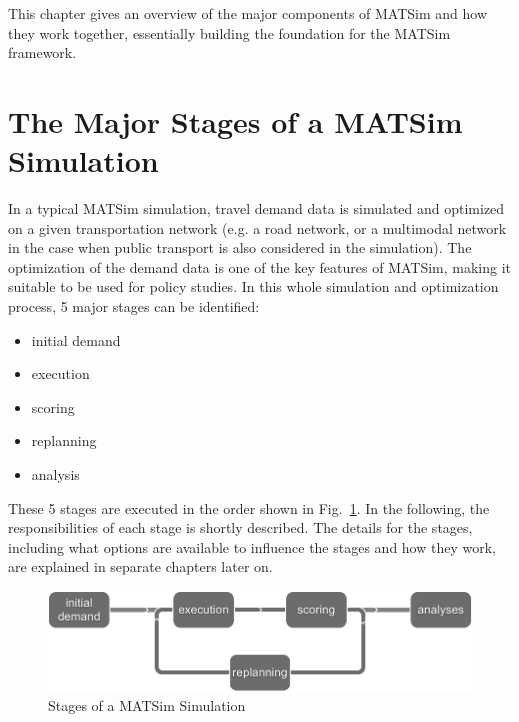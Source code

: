 
 
\bigskip

\begin{chapter-intro}
This chapter gives an overview of the major components of MATSim and how they
work together, essentially building the foundation for the MATSim framework.
\end{chapter-intro}

\section{The Major Stages of a MATSim Simulation}

In a typical MATSim simulation, travel demand data is simulated and optimized on
a given transportation network (e.g. a road network, or a multimodal network in
the case when public transport is also considered in the simulation).
The optimization of the demand data is one of the key features of MATSim, making
it suitable to be used for policy studies. In this whole simulation and
optimization process, 5 major stages can be identified:
\begin{itemize}\styleItemize
	\item initial demand
	\item execution
	\item scoring
	\item replanning
	\item analysis
\end{itemize}

These 5 stages are executed in the order shown in
Fig.~\ref{fig:overview:controllerFlow}.
In the following, the responsibilities of each stage is shortly described. The
details for the stages, including what options are available to influence the
stages and how they work, are explained in separate chapters later on.


\begin{figure}[htp]
\begin{center}
  \includegraphics[width=.8\textwidth]{figures/overview/controllerFlow.png}
  \caption{Stages of a MATSim Simulation}
  \label{fig:overview:controllerFlow}
\end{center}
\end{figure}


